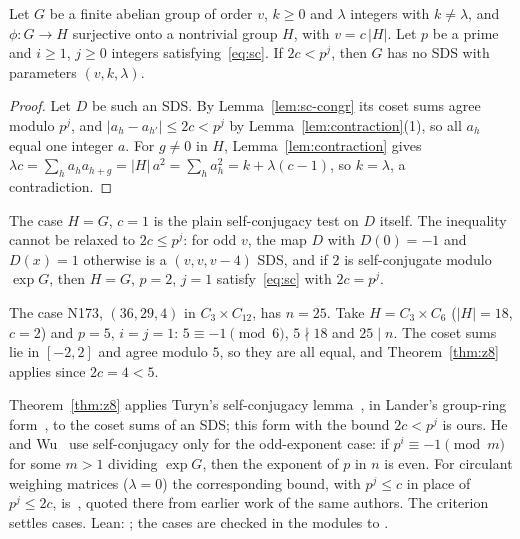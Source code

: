 \begin{theorem}\label{thm:z8}
Let $G$ be a finite abelian group of order $v$, $k \ge 0$ and $\lambda$ integers with
$k \neq \lambda$, and $\phi \colon G \to H$ surjective onto a nontrivial group $H$, with
$v = c\,|H|$. Let $p$ be a prime and $i \ge 1$, $j \ge 0$ integers satisfying~\eqref{eq:sc}.
If $2c < p^j$, then $G$ has no SDS with parameters $(v,k,\lambda)$.
\end{theorem}

\begin{proof}
Let $D$ be such an SDS. By Lemma~\ref{lem:sc-congr} its coset sums agree modulo $p^j$, and
$|a_h - a_{h'}| \le 2c < p^j$ by Lemma~\ref{lem:contraction}(1), so all $a_h$ equal one integer
$a$. For $g \neq 0$ in $H$, Lemma~\ref{lem:contraction} gives
$\lambda c = \sum_h a_h a_{h+g} = |H|\, a^2 = \sum_h a_h^2 = k + \lambda(c - 1)$, so
$k = \lambda$, a contradiction.
\end{proof}

The case $H = G$, $c = 1$ is the plain self-conjugacy test on $D$ itself. The inequality
cannot be relaxed to $2c \le p^j$: for odd $v$, the map $D$ with $D(0) = -1$ and $D(x) = 1$
otherwise is a $(v, v, v - 4)$ SDS, and if $2$ is self-conjugate modulo $\exp G$, then $H = G$,
$p = 2$, $j = 1$ satisfy~\eqref{eq:sc} with $2c = p^j$.

\begin{example}
The case N173, $(36, 29, 4)$ in $C_3 \times C_{12}$, has $n = 25$. Take $H = C_3 \times C_6$
($|H| = 18$, $c = 2$) and $p = 5$, $i = j = 1$: $5 \equiv -1 \pmod 6$, $5 \nmid 18$ and
$25 \mid n$. The coset sums lie in $[-2, 2]$ and agree modulo $5$, so they are all equal, and
Theorem~\ref{thm:z8} applies since $2c = 4 < 5$.
\end{example}

\begin{remark}
Theorem~\ref{thm:z8} applies Turyn's self-conjugacy lemma~\cite[Lemma~3]{turyn}, in Lander's
group-ring form~\cite[Thm.~2.1]{arasu-gordon-zhang}, to the coset sums of an SDS; this form
with the bound $2c < p^j$ is ours. He and Wu~\cite[Thm.~3.2]{he-wu} use self-conjugacy only
for the odd-exponent case: if $p^{i} \equiv -1 \pmod m$ for some $m > 1$ dividing $\exp G$,
then the exponent of $p$ in $n$ is even. For circulant weighing matrices ($\lambda = 0$) the
corresponding bound, with $p^j \le c$ in place of $p^j \le 2c$, is~\cite[Thm.~3]{arasu-seberry},
quoted there from earlier work of the same authors. The criterion settles  cases. Lean:
; the cases are checked in the modules
 to .
\end{remark}

